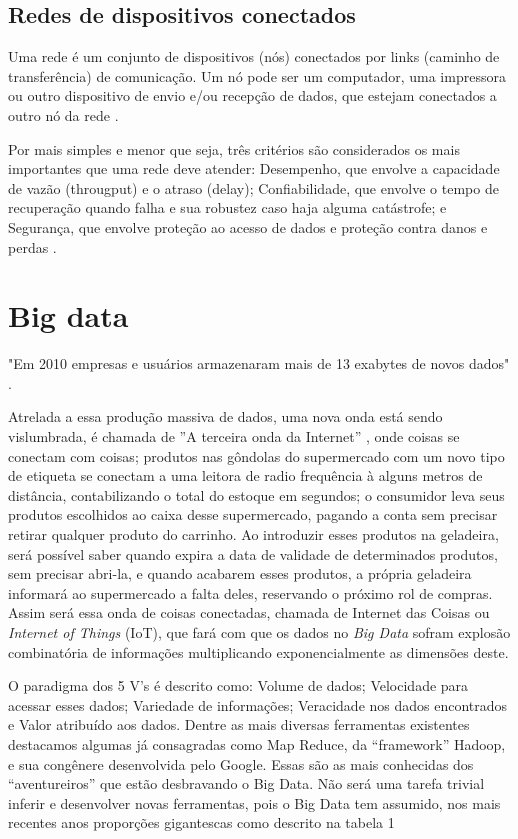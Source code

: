 \documentclass[conference,compsoc]{IEEEtran}
\begin{document}
\subsection{Redes de dispositivos conectados}
Uma rede é um conjunto de dispositivos (nós) conectados por links (caminho de transferência) de comunicação.  Um nó pode ser um computador, uma impressora ou outro dispositivo de envio e/ou recepção de dados, que estejam conectados a outro nó da rede \cite{Forouzan}.

Por mais simples e menor que seja, três critérios são considerados os mais importantes que uma rede deve atender: Desempenho, que envolve a capacidade de vazão (througput) e o atraso (delay); Confiabilidade, que envolve o tempo de recuperação quando falha e sua robustez caso haja alguma catástrofe; e Segurança, que envolve proteção ao acesso de dados e proteção contra danos e perdas \cite{Forouzan} \cite{Specialski}.



\section{Big data}

"Em 2010 empresas e usuários armazenaram mais de 13 exabytes de novos dados" \cite{bigdataQualquerUm}.

Atrelada a essa produção massiva de dados, uma nova onda está sendo vislumbrada, é chamada de ''A terceira onda da Internet''
, onde coisas se conectam com coisas; produtos nas gôndolas do supermercado com um novo tipo de etiqueta se conectam a uma 
leitora de radio frequência à alguns metros de distância, contabilizando o total do estoque em segundos; o consumidor leva 
seus produtos escolhidos ao caixa desse supermercado, pagando a conta sem precisar retirar qualquer produto do carrinho. 
Ao introduzir esses produtos na geladeira, será possível saber quando expira a data de validade de determinados produtos, sem 
precisar abri-la, e quando acabarem esses produtos, a própria geladeira informará ao supermercado a falta deles, reservando 
o próximo rol de compras. Assim será essa onda de coisas conectadas, chamada de Internet das Coisas ou \textit{Internet of Things} (IoT),
que fará com que os dados no \textit{Big Data} sofram explosão combinatória de informações multiplicando exponencialmente as dimensões deste.


O paradigma dos 5 V’s é descrito como: Volume de dados; Velocidade para acessar esses dados; 
Variedade de informações; Veracidade nos dados encontrados e Valor atribuído aos dados. 
Dentre as mais diversas ferramentas existentes destacamos algumas já consagradas como Map Reduce, da ``framework'' Hadoop,
e sua congênere desenvolvida pelo Google. Essas são as mais conhecidas dos ``aventureiros'' que estão desbravando o Big Data. Não será uma tarefa trivial inferir e desenvolver novas ferramentas, pois o Big Data tem 
assumido, nos mais recentes anos proporções gigantescas como descrito na tabela 1
\end{document}
